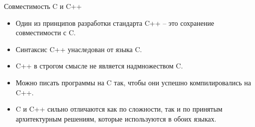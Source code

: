 \documentclass[
    9pt,
    hyperref={pdfencoding=unicode}
    ]{beamer}
\begin{document}
\begin{frame}{Совместимость C и C++}
    \begin{itemize}
        \item Один из принципов разработки стандарта C++ – это
        сохранение совместимости с C.
        \item Синтаксис C++ унаследован от языка C.
        \item C++ в строгом смысле не является надмножеством C.
        \item Можно писать программы на C так, чтобы они успешно
        компилировались на C++.
        \item C и C++ сильно отличаются как по сложности, так и по принятым архитектурным решениям, которые используются
        в обоих языках.
    \end{itemize}    
\end{frame}
\end{document}
